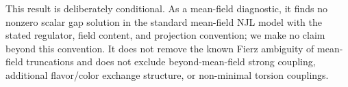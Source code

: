 \documentclass[aps,prd,twocolumn,superscriptaddress,preprintnumbers,nofootinbib,longbibliography,floatfix]{revtex4-2}
\begin{document}
This result is deliberately conditional.  As a mean-field diagnostic, it finds
no nonzero scalar gap solution in the standard mean-field NJL model with the
stated regulator, field content, and projection convention; we make no claim
beyond this convention.  It does not remove the known Fierz ambiguity of
mean-field truncations and does not exclude beyond-mean-field strong coupling,
additional flavor/color exchange structure, or non-minimal torsion couplings.

\end{document}
